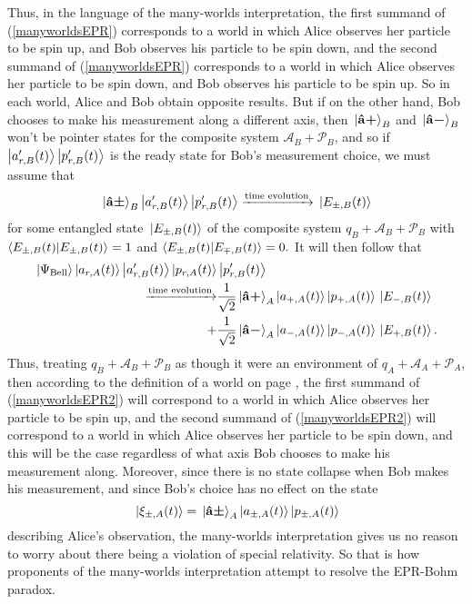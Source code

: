 Thus, in the language of the many-worlds interpretation, the first summand of (\ref{manyworldsEPR}) corresponds to a world in which Alice observes her particle to be spin up, and Bob observes his particle to be spin down, and the second summand of (\ref{manyworldsEPR}) corresponds to a world in which Alice observes her particle to be spin down, and Bob observes his particle to be spin up. So in each world, Alice and Bob obtain opposite results. But if on the other hand, Bob chooses to make his measurement along a different axis, then $\ket*{\vb{\hat{{a}}}\bm{+}}_B$ and $\ket*{\vb{\hat{{a}}}\bm{-}}_B$ won't be pointer states for the composite system $\mathcal{A}_B+\mathcal{P}_B$, and so if   $\ket{a_{r,B}'(t)}\ket{p_{r, B}'(t)}$ is the ready state for Bob's measurement choice, we must assume that
$$\ket*{\vb{\hat{{a}}}\bm{\pm}}_B\ket{a_{r,B}'(t)}\ket{p_{r, B}'(t)}\xrightarrow{\text{time evolution}}\ket*{E_{\pm,B}(t)}$$ 
for some entangled state $\ket*{E_{\pm,B}(t)}$ of the composite system $q_B+\mathcal{A}_B+\mathcal{P}_B$ with $\ip{E_{\pm,B}(t)}{E_{\pm,B}(t)}=1$ and   $\ip{E_{\pm,B}(t)}{E_{\mp,B}(t)}=0.$ It will then follow that 
\begin{equation}\label{manyworldsEPR2}
  \begin{split}\ket*{\Psi_{\text{Bell}}}\ket{a_{r,A}(t)}\ket{a_{r,B}'(t)}\ket{p_{r, A}(t)}&\ket{p_{r, B}'(t)}\\ 
    \xrightarrow{\text{time evolution}}&\frac{1}{\sqrt{2}}\ket*{\vb{\hat{{a}}}\bm{+}}_A\ket{a_{+,A}(t)}\ket{p_{+, A}(t)}\ket*{E_{-,B}(t)}\\
  +& \frac{1}{\sqrt{2}}\ket*{\vb{\hat{{a}}}\bm{-}}_A\ket{a_{-,A}(t)}\ket{p_{-, A}(t)}\ket*{E_{+,B}(t)}.\end{split}
\end{equation}
Thus, treating $q_B+\mathcal{A}_B+\mathcal{P}_B$ as though it were an environment of $q_A+\mathcal{A}_A+\mathcal{P}_A$, then according to the definition of a world on page \pageref{rigorousworld}, the first summand of (\ref{manyworldsEPR2}) will correspond to a world in which Alice observes her particle to be spin up, and the second summand of (\ref{manyworldsEPR2}) will correspond to a world in which Alice observes her particle to be spin down, and this will be the case regardless of what axis Bob chooses to make his measurement along. Moreover, since there is no state collapse when Bob makes his measurement, and since Bob's choice has no effect on the state 
$$\ket*{\xi_{\pm,A}(t)}=\ket*{\vb{\hat{{a}}}\bm{\pm}}_A\ket{a_{\pm,A}(t)}\ket{p_{\pm, A}(t)}$$
describing Alice's observation, the many-worlds interpretation gives us no reason to worry about there being a violation of special relativity. So that is how proponents of the many-worlds interpretation attempt to resolve the EPR-Bohm paradox.







   
